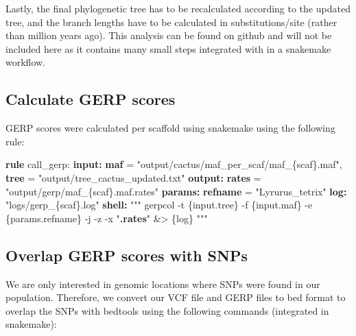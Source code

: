 \documentclass[
  letterpaper,
  DIV=11,
  numbers=noendperiod]{scrreprt}
\newenvironment{Shaded}{}{}
\newcommand{\ExtensionTok}[1]{\textcolor[rgb]{0.84,0.23,0.29}{\textbf{#1}}}
\newcommand{\NormalTok}[1]{\textcolor[rgb]{0.14,0.16,0.18}{#1}}
\newcommand{\StringTok}[1]{\textcolor[rgb]{0.01,0.18,0.38}{#1}}
\begin{document}
Lastly, the final phylogenetic tree has to be recalculated according to
the updated tree, and the branch lengths have to be calculated in
substitutions/site (rather than million years ago). This analysis can be
found on github and will not be included here as it contains many small
steps integrated with in a snakemake workflow.

\hypertarget{calculate-gerp-scores}{%
\subsection{Calculate GERP scores}\label{calculate-gerp-scores}}

GERP scores were calculated per scaffold using snakemake using the
following rule:

\begin{Shaded}
\begin{Highlighting}[]
\ExtensionTok{rule}\NormalTok{ call\_gerp:}
    \ExtensionTok{input:}
      \ExtensionTok{maf}\NormalTok{ = }\StringTok{"output/cactus/maf\_per\_scaf/maf\_\{scaf\}.maf"}\NormalTok{,}
      \ExtensionTok{tree}\NormalTok{ = }\StringTok{"output/tree\_cactus\_updated.txt"}
    \ExtensionTok{output:}
      \ExtensionTok{rates}\NormalTok{ = }\StringTok{"output/gerp/maf\_\{scaf\}.maf.rates"}
    \ExtensionTok{params:}
      \ExtensionTok{refname}\NormalTok{ = }\StringTok{"Lyrurus\_tetrix"}
    \ExtensionTok{log:} \StringTok{"logs/gerp\_\{scaf\}.log"}
    \ExtensionTok{shell:}
      \StringTok{"""}
\StringTok{      gerpcol {-}t \{input.tree\} {-}f \{input.maf\} {-}e \{params.refname\} {-}j {-}z {-}x "}\ExtensionTok{.rates}\StringTok{" \&\textgreater{} \{log\}}
\StringTok{      """}
\end{Highlighting}
\end{Shaded}

\hypertarget{overlap-gerp-scores-with-snps}{%
\subsection{Overlap GERP scores with
SNPs}\label{overlap-gerp-scores-with-snps}}

We are only interested in genomic locations where SNPs were found in our
population. Therefore, we convert our VCF file and GERP files to bed
format to overlap the SNPs with bedtools using the following commands
(integrated in snakemake):
\end{document}

